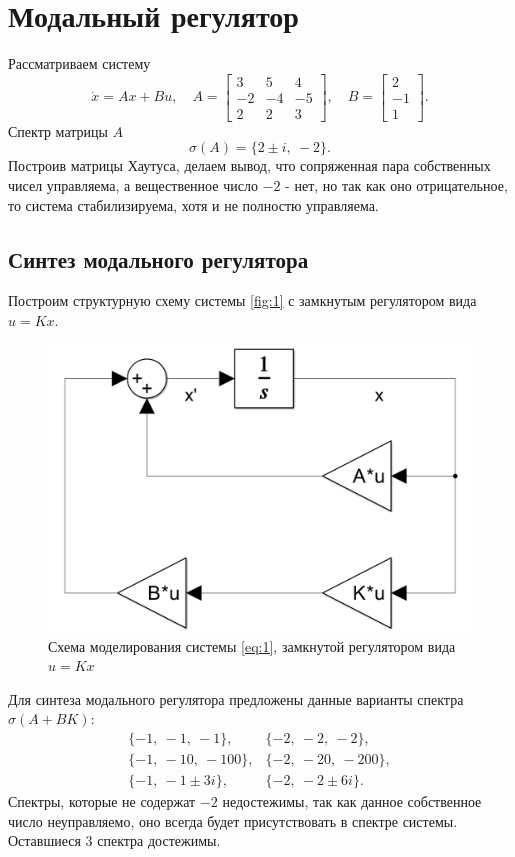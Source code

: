 \section{Модальный регулятор}

Рассматриваем систему
\begin{equation}
    \dot x = Ax+Bu,\quad
    A=\begin{bmatrix}
        3 & 5 & 4 \\
        -2 & -4 & -5 \\
        2 & 2 & 3
    \end{bmatrix},\quad
    B=\begin{bmatrix}
        2 \\ -1 \\ 1
    \end{bmatrix}.
    \label{eq:1}
\end{equation}
Спектр матрицы $A$
\begin{equation*}
    \sigma(A)=\{2\pm i,\ -2\}.
\end{equation*}
Построив матрицы Хаутуса, делаем вывод, что сопряженная пара
собственных чисел управляема, а вещественное число $-2$ - нет,
но так как оно отрицательное, то система стабилизируема, хотя и
не полностю управляема. 

\subsection{Синтез модального регулятора}

Построим структурную схему системы \autoref{fig:1} 
с замкнутым регулятором вида $u=Kx$.
\begin{figure}[H]
    \centering
    \includegraphics[width=0.7\linewidth]{figs/task1_slx.png}
    \caption{Схема моделирования системы \ref{eq:1}, замкнутой
    регулятором вида $u=Kx$}
    \label{fig:1}
\end{figure}
\noindent Для синтеза модального регулятора предложены 
данные варианты спектра $\sigma(A+BK)$:
\begin{equation*}
    \begin{array}{rl}
        \{-1,\ -1,\ -1\}, & \{-2,\ -2,\ -2\}, \\
        \{-1,\ -10,\ -100\}, & \{-2,\ -20,\ -200\}, \\
        \{-1,\ -1\pm 3i\}, & \{-2,\ -2\pm 6i\}.
    \end{array}
\end{equation*}
Спектры, которые не содержат $-2$ недостежимы, так как
данное собственное число неуправляемо, оно всегда будет
присутствовать в спектре системы. Оставшиеся
3 спектра достежимы.

